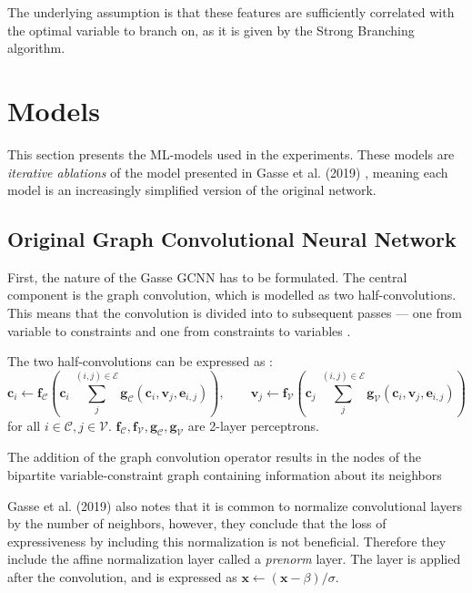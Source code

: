 The underlying assumption is that these features are sufficiently correlated with the optimal variable to branch on, as it is given by the Strong Branching algorithm.



\section{Models}\label{sec:models}

This section presents the \gls{ML}-models used in the experiments. These models are \textit{iterative ablations} of the model presented in Gasse et al. (2019) \cite{gasse2019exact}, meaning each model is an increasingly simplified version of the original network. 


\subsection{Original Graph Convolutional Neural Network}\label{ssec:models_gcnn}

First, the nature of the Gasse GCNN has to be formulated. The central component is the graph convolution, which is modelled as two half-convolutions. This means that the convolution is divided into to subsequent passes --- one from variable to constraints and one from constraints to variables \cite{gasse2019exact}. 

The two half-convolutions can be expressed as \cite{gasse2019exact}:
\begin{equation}
    \mathbf{c}_i \leftarrow \mathbf{f}_{\mathcal{C}}\left( \mathbf{c}_i \; \sum_j^{(i,j) \in \mathcal{E}}\mathbf{g}_{\mathcal{C}} (\mathbf{c}_i, \mathbf{v}_j, \mathbf{e}_{i,j})\right), \qquad
    \mathbf{v}_j \leftarrow \mathbf{f}_{\mathcal{V}}\left( \mathbf{c}_j \; \sum_j^{(i,j) \in \mathcal{E}}\mathbf{g}_{\mathcal{V}} (\mathbf{c}_i, \mathbf{v}_j, \mathbf{e}_{i,j})\right)
\end{equation}
for all $i \in \mathcal{C}, j \in \mathcal{V}$. $\mathbf{f}_{\mathcal{C}},\mathbf{f}_{\mathcal{V}},\mathbf{g}_{\mathcal{C}},\mathbf{g}_{\mathcal{V}}$ are 2-layer perceptrons. 

The addition of the graph convolution operator results in the nodes of the bipartite variable-constraint graph containing information about its neighbors 

Gasse et al. (2019) \cite{gasse2019exact} also notes that it is common to normalize convolutional layers by the number of neighbors, however, they conclude that the loss of expressiveness by including this normalization is not beneficial. Therefore they include the affine normalization layer called a \textit{prenorm} layer. The layer is applied after the convolution, and is expressed as $ \mathbf{x} \leftarrow (\mathbf{x}-\beta)/\sigma$. 

